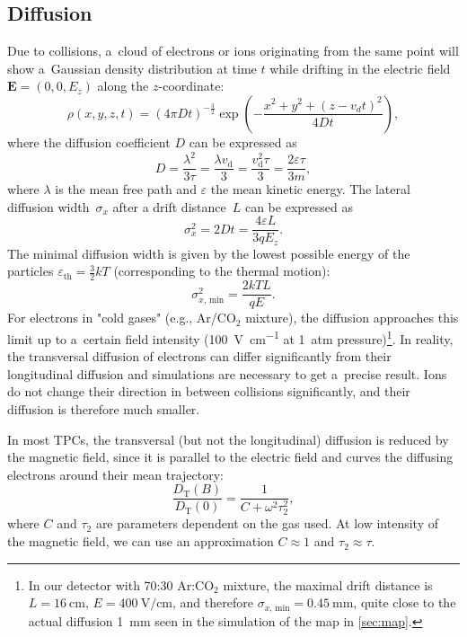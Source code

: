 		\subsection{Diffusion}
			Due to collisions, a~cloud of electrons or ions originating from the same point will show a~Gaussian density distribution at time $t$ while drifting in the electric field $\mathbf{E} = (0,0,E_z)$ along the $z$\nobreakdash-coordinate:
				\begin{equation}
					\rho(x,y,z,t) = (4\pi Dt)^{-\frac{3}{2}} \exp\left(-\frac{x^2+y^2+(z-v_dt)^2}{4Dt}\right),
				\end{equation}
			where the diffusion coefficient $D$ can be expressed as
				\begin{equation}
					D = \frac{\lambda^2}{3\tau} = \frac{\lambda v_\text{d}}{3} = \frac{v_\text{d}^2\tau}{3} = \frac{2\varepsilon\tau}{3m},
				\end{equation}
			where $\lambda$ is the mean free path and $\varepsilon$ the mean kinetic energy. The lateral diffusion width~$\sigma_x$ after a drift distance~$L$ can be expressed as
				\begin{equation}
					\sigma_x^2 = 2Dt = \frac{4\varepsilon L}{3qE_z}.
				\end{equation}
			The minimal diffusion width is given by the lowest possible energy of the particles $\varepsilon_\text{th} = \frac{3}{2}kT$ (corresponding to the thermal motion):
				\begin{equation}
					\sigma_{x, \,\text{min}}^2 = \frac{2kTL}{qE}.
				\end{equation}
			For electrons in "cold gases" (e.g., Ar/CO$_2$ mixture), the diffusion approaches this limit up to a~certain field intensity (\textapprox\qty{100}{\V\per\cm} at 1~atm pressure)\footnote{In our detector with 70:30 Ar:CO$_2$ mixture, the maximal drift distance is $L=\qty{16}{\cm}$, $E=\qty{400}{\V\per\cm}$, and therefore $\sigma_{x, \,\text{min}} = \qty{0.45}{\mm}$, quite close to the actual diffusion \textapprox\qty{1}{\mm} seen in the simulation of the map in \cref{sec:map}.}. In reality, the transversal diffusion of electrons can differ significantly from their longitudinal diffusion and simulations are necessary to get a~precise result. Ions do not change their direction in between collisions significantly, and their diffusion is therefore much smaller.
			
			In most \acp{TPC}, the transversal (but not the longitudinal) diffusion is reduced by the magnetic field, since it is parallel to the electric field and curves the diffusing electrons around their mean trajectory:
				\begin{equation}
					\label{eq:difmag}
					\frac{D_\text{T}(B)}{D_\text{T}(0)} = \frac{1}{C+\omega^2\tau_2^2},
				\end{equation}
			where $C$ and $\tau_2$ are parameters dependent on the gas used. At low intensity of the magnetic field, we can use an approximation $C\approx1$ and $\tau_2\approx\tau$.
			
